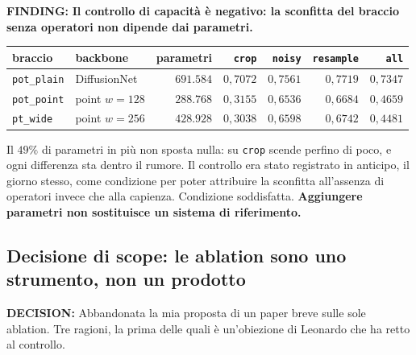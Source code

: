 \documentclass[11pt,a4paper]{article}
\newcommand{\finding}[1]{\textcolor{finding}{\textbf{FINDING:}} #1}
\newcommand{\decision}[1]{\textcolor{decision}{\textbf{DECISION:}} #1}
\begin{document}
\finding{\textbf{Il controllo di capacit\`a \`e negativo: la sconfitta del braccio senza
operatori non dipende dai parametri.}}

\begin{center}\small
\begin{tabular}{llrrrrr}
\toprule
braccio & backbone & parametri & \texttt{crop} & \texttt{noisy} & \texttt{resample} & \texttt{all} \\
\midrule
\texttt{pot\_plain} & DiffusionNet   & $691{.}584$ & $0{,}7072$ & $0{,}7561$ & $0{,}7719$ & $0{,}7347$ \\
\texttt{pot\_point} & point $w{=}128$ & $288{.}768$ & $0{,}3155$ & $0{,}6536$ & $0{,}6684$ & $0{,}4659$ \\
\texttt{pt\_wide}   & point $w{=}256$ & $428{.}928$ & $0{,}3038$ & $0{,}6598$ & $0{,}6742$ & $0{,}4481$ \\
\bottomrule
\end{tabular}
\end{center}

Il $49\%$ di parametri in pi\`u non sposta nulla: su \texttt{crop} scende perfino di poco, e ogni
differenza sta dentro il rumore. Il controllo era stato registrato in anticipo, il giorno stesso,
come condizione per poter attribuire la sconfitta all'assenza di operatori invece che alla
capienza. Condizione soddisfatta. \textbf{Aggiungere parametri non sostituisce un sistema di
riferimento.}

\subsection*{Decisione di scope: le ablation sono uno strumento, non un prodotto}

\decision{Abbandonata la mia proposta di un paper breve sulle sole ablation. Tre ragioni, la
prima delle quali \`e un'obiezione di Leonardo che ha retto al controllo.}
\end{document}
